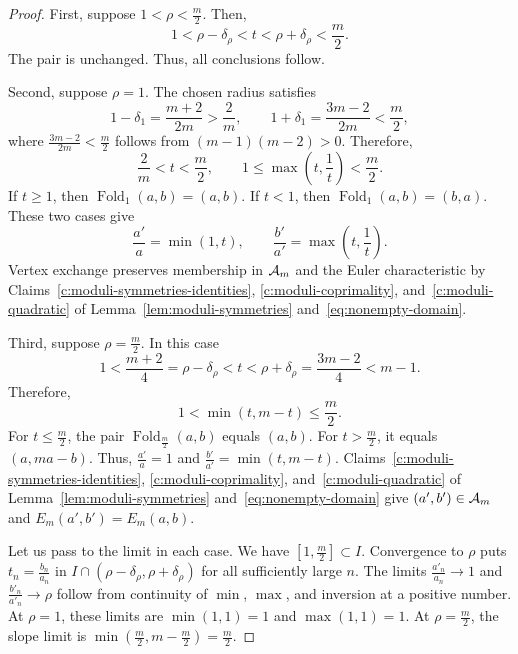 \begin{proof}
First, suppose $1<\rho<\frac m2$. Then,
\[
 1<\rho-\delta_\rho<t<\rho+\delta_\rho<\frac m2.
\]
The pair is unchanged. Thus, all conclusions follow.

Second, suppose $\rho=1$. The chosen radius satisfies
\[
 1-\delta_1=\frac{m+2}{2m}>\frac2m,
 \qquad
 1+\delta_1=\frac{3m-2}{2m}<\frac m2,
\]
where $\frac{3m-2}{2m}<\frac m2$ follows from $(m-1)(m-2)>0$. Therefore,
\[
 \frac2m<t<\frac m2,
 \qquad 1\le\max(t,\frac1t)<\frac m2.
\]
If $t\ge1$, then $\operatorname{Fold}_1(a,b)=(a,b)$. If $t<1$, then $\operatorname{Fold}_1(a,b)=(b,a)$. These two cases give
\[
 \frac{a'}a=\min(1,t),\qquad \frac{b'}{a'}=\max(t,\frac1t).
\]
Vertex exchange preserves membership in $\mathcal A_m$ and the Euler characteristic by Claims~\ref{c:moduli-symmetries-identities}, \ref{c:moduli-coprimality}, and~\ref{c:moduli-quadratic} of Lemma~\ref{lem:moduli-symmetries} and~\eqref{eq:nonempty-domain}.

Third, suppose $\rho=\frac m2$. In this case
\[
 1<\frac{m+2}{4}=\rho-\delta_\rho<t
 <\rho+\delta_\rho=\frac{3m-2}{4}<m-1.
\]
Therefore,
\[
 1<\min(t,m-t)\le \frac m2.
\]
For $t\le \frac m2$, the pair $\operatorname{Fold}_{\frac m2}(a,b)$ equals $(a,b)$.
For $t>\frac m2$, it equals $(a,ma-b)$.
Thus, $\frac{a'}a=1$ and $\frac{b'}{a'}=\min(t,m-t)$.
Claims~\ref{c:moduli-symmetries-identities}, \ref{c:moduli-coprimality}, and~\ref{c:moduli-quadratic} of Lemma~\ref{lem:moduli-symmetries} and~\eqref{eq:nonempty-domain} give $(a',b')\in\mathcal A_m$ and $E_m(a',b')=E_m(a,b)$.

Let us pass to the limit in each case. We have $[1,\frac m2]\subset I$. Convergence to $\rho$ puts $t_n=\frac{b_n}{a_n}$ in $I\cap(\rho-\delta_\rho,\rho+\delta_\rho)$ for all sufficiently large $n$. The limits $\frac{a'_n}{a_n}\to1$ and $\frac{b'_n}{a'_n}\to\rho$ follow from continuity of $\min$, $\max$, and inversion at a positive number. At $\rho=1$, these limits are $\min(1,1)=1$ and $\max(1,1)=1$. At $\rho=\frac m2$, the slope limit is $\min(\frac m2,m-\frac m2)=\frac m2$.
\end{proof}

